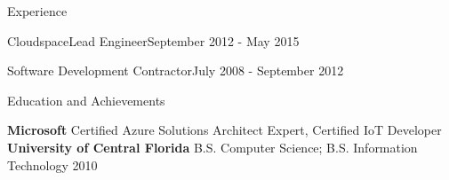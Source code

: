 \documentclass{resume} %
\begin{document}
\begin{rSection}{Experience}
\begin{rSubsection}{Cloudspace}{Lead Engineer}{September 2012 - May 2015}
\end{rSubsection}


\begin{rSubsectionTitleOnly}{Software Development Contractor}{July 2008 - September 2012}
\end{rSubsectionTitleOnly}



\end{rSection}

\vspace{0.5em} %
\begin{rSection}{Education and Achievements}

    {\bf Microsoft } Certified Azure Solutions Architect Expert, Certified IoT Developer \\ 
    {\bf University of Central Florida } B.S. Computer Science; B.S. Information Technology  \hfill 2010

\end{rSection}
\end{document}
